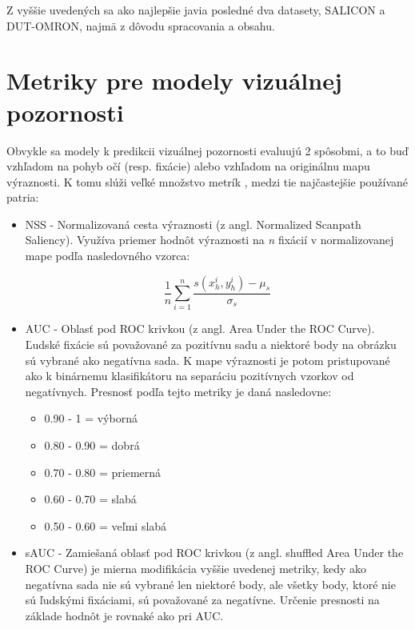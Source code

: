 Z vyššie uvedených sa ako najlepšie javia posledné dva datasety, SALICON a DUT-OMRON, najmä z dôvodu spracovania a obsahu.

\section{Metriky pre modely vizuálnej pozornosti}
\label{metric}

Obvykle sa modely k predikcii vizuálnej pozornosti evaluujú 2 spôsobmi, a to buď vzhľadom na pohyb očí (resp. fixácie) alebo vzhľadom na originálnu mapu výraznosti. K tomu slúži veľké množstvo metrík \cite{metriky}\cite{bylinskii2016different}, medzi tie najčastejšie používané patria:

\begin{itemize}
	
	\item NSS - Normalizovaná cesta výraznosti (z angl. Normalized Scanpath Saliency). Využíva priemer hodnôt výraznosti na \textit{n} fixácií v normalizovanej mape podľa nasledovného vzorca: 
	
	\begin{equation}
	\frac{1}{n} \sum_{i=1}^{n} \frac{s(x_{h}^{i}, y_{h}^{i}) - \mu_{s}}{\sigma _{s}}
	\end{equation}
	
	\item AUC - Oblasť pod ROC krivkou (z angl. Area Under the ROC Curve).
	Ľudské fixácie sú považované za pozitívnu sadu a niektoré body na obrázku sú vybrané ako negatívna sada. K mape výraznosti je potom pristupované ako k binárnemu klasifikátoru na separáciu pozitívnych vzorkov od negatívnych. Presnosť podľa tejto metriky je daná nasledovne: 
	
	\begin{itemize}
		
		\item 0.90 - 1 = výborná
		\item 0.80 - 0.90 = dobrá
		\item 0.70 - 0.80 = priemerná
		\item 0.60 - 0.70 = slabá
		\item 0.50 - 0.60 = veľmi slabá
		
	\end{itemize}
	
	\item sAUC - Zamiešaná oblasť pod ROC krivkou (z angl. shuffled Area Under the ROC Curve) je mierna modifikácia vyššie uvedenej metriky, kedy ako negatívna sada nie sú vybrané len niektoré body, ale všetky body, ktoré nie sú ľudskými fixáciami, sú považované za negatívne. Určenie presnosti na základe hodnôt je rovnaké ako pri AUC. 
	

\end{itemize}
